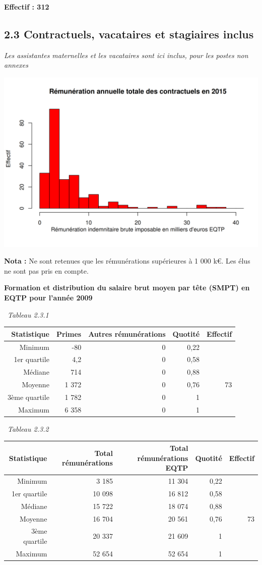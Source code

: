 \textbf{Effectif : 312 }

\hypertarget{contractuels-vacataires-et-stagiaires-inclus}{%
\subsection{2.3 Contractuels, vacataires et stagiaires
inclus}\label{contractuels-vacataires-et-stagiaires-inclus}}

\emph{Les assistantes maternelles et les vacataires sont ici inclus,
pour les postes non annexes}

\includegraphics{altair_files/figure-latex/unnamed-chunk-61-1.png}

\textbf{Nota :} Ne sont retenues que les rémunérations supérieures à 1
000 k€. Les élus ne sont pas pris en compte.

\textbf{Formation et distribution du salaire brut moyen par tête (SMPT)
en EQTP pour l'année 2009 }

~\emph{Tableau 2.3.1}

\begin{longtable}[]{@{}rrrrr@{}}
\toprule
Statistique & Primes & Autres rémunérations & Quotité &
Effectif\tabularnewline
\midrule
\endhead
Minimum & -80 & 0 & 0,22 &\tabularnewline
1er quartile & 4,2 & 0 & 0,58 &\tabularnewline
Médiane & 714 & 0 & 0,88 &\tabularnewline
Moyenne & 1 372 & 0 & 0,76 & 73\tabularnewline
3ème quartile & 1 782 & 0 & 1 &\tabularnewline
Maximum & 6 358 & 0 & 1 &\tabularnewline
\bottomrule
\end{longtable}

~\emph{Tableau 2.3.2}

\begin{longtable}[]{@{}rrrrr@{}}
\toprule
Statistique & Total rémunérations & Total rémunérations EQTP & Quotité &
Effectif\tabularnewline
\midrule
\endhead
Minimum & 3 185 & 11 304 & 0,22 &\tabularnewline
1er quartile & 10 098 & 16 812 & 0,58 &\tabularnewline
Médiane & 15 722 & 18 074 & 0,88 &\tabularnewline
Moyenne & 16 704 & 20 561 & 0,76 & 73\tabularnewline
3ème quartile & 20 337 & 21 609 & 1 &\tabularnewline
Maximum & 52 654 & 52 654 & 1 &\tabularnewline
\bottomrule
\end{longtable}

